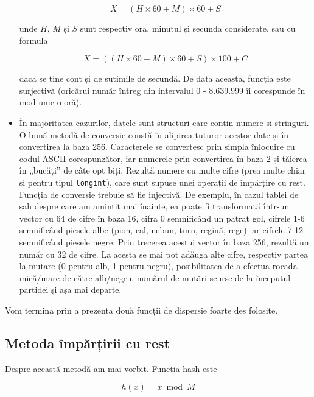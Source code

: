 \begin{itemize}
  \begin{equation}
    X = (H \times 60 + M) \times 60 + S
  \end{equation}

  unde $H$, $M$ și $S$ sunt respectiv ora, minutul și secunda considerate, sau
  cu formula

  \begin{equation}
    X = ((H \times 60 + M) \times 60 + S) \times 100 + C
  \end{equation}

  dacă se ține cont și de sutimile de secundă. De data aceasta, funcția este
  surjectivă (oricărui număr întreg din intervalul 0 - 8.639.999 îi corespunde
  în mod unic o oră).

\item În majoritatea cazurilor, datele sunt structuri care conțin numere și
  stringuri. O bună metodă de conversie constă în alipirea tuturor acestor
  date și în convertirea la baza 256. Caracterele se convertesc prin simpla
  înlocuire cu codul ASCII corespunzător, iar numerele prin convertirea în
  baza 2 și tăierea în „bucăți” de câte opt biți. Rezultă numere cu multe
  cifre (prea multe chiar și pentru tipul {\tt longint}), care sunt supuse
  unei operații de împărțire cu rest. Funcția de conversie trebuie să fie
  injectivă. De exemplu, în cazul tablei de șah despre care am amintit mai
  înainte, ea poate fi transformată într-un vector cu 64 de cifre în baza 16,
  cifra 0 semnificând un pătrat gol, cifrele 1-6 semnificând piesele albe
  (pion, cal, nebun, turn, regină, rege) iar cifrele 7-12 semnificând piesele
  negre. Prin trecerea acestui vector în baza 256, rezultă un număr cu 32 de
  cifre. La acesta se mai pot adăuga alte cifre, respectiv partea la mutare (0
  pentru alb, 1 pentru negru), posibilitatea de a efectua rocada mică/mare de
  către alb/negru, numărul de mutări scurse de la începutul partidei și așa
  mai departe.

\end{itemize}

Vom termina prin a prezenta două funcții de dispersie foarte des folosite.

\subsection{Metoda împărțirii cu rest}

Despre această metodă am mai vorbit. Funcția hash este

\begin{equation}
  h(x)=x \bmod M
\end{equation}

